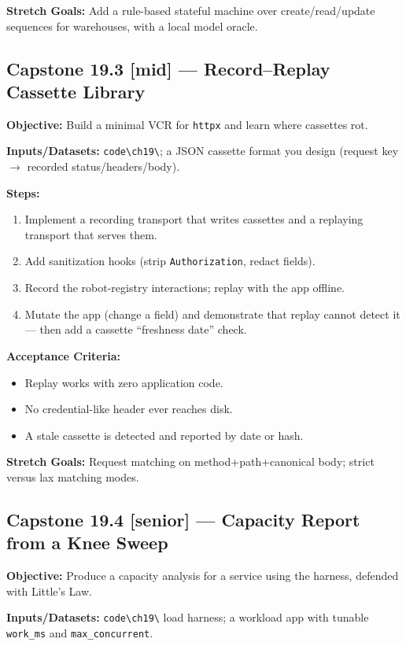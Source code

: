 \textbf{Stretch Goals:} Add a rule-based stateful machine over
create/read/update sequences for warehouses, with a local model oracle.

\subsection*{Capstone 19.3 [mid] --- Record--Replay Cassette Library}
\textbf{Objective:} Build a minimal VCR for \texttt{httpx} and learn where
cassettes rot.

\textbf{Inputs/Datasets:} \texttt{code\textbackslash{}ch19\textbackslash{}};
a JSON cassette format you design (request key $\rightarrow$ recorded
status/headers/body).

\textbf{Steps:}
\begin{enumerate}
  \item Implement a recording transport that writes cassettes and a
        replaying transport that serves them.
  \item Add sanitization hooks (strip \texttt{Authorization}, redact
        fields).
  \item Record the robot-registry interactions; replay with the app
        offline.
  \item Mutate the app (change a field) and demonstrate that replay cannot
        detect it --- then add a cassette ``freshness date'' check.
\end{enumerate}

\textbf{Acceptance Criteria:}
\begin{itemize}
  \item[$\square$] Replay works with zero application code.
  \item[$\square$] No credential-like header ever reaches disk.
  \item[$\square$] A stale cassette is detected and reported by date or
        hash.
\end{itemize}

\textbf{Stretch Goals:} Request matching on method+path+canonical body;
strict versus lax matching modes.

\subsection*{Capstone 19.4 [senior] --- Capacity Report from a Knee Sweep}
\textbf{Objective:} Produce a capacity analysis for a service using the
harness, defended with Little's Law.

\textbf{Inputs/Datasets:} \texttt{code\textbackslash{}ch19\textbackslash{}}
load harness; a workload app with tunable \texttt{work\_ms} and
\texttt{max\_concurrent}.

